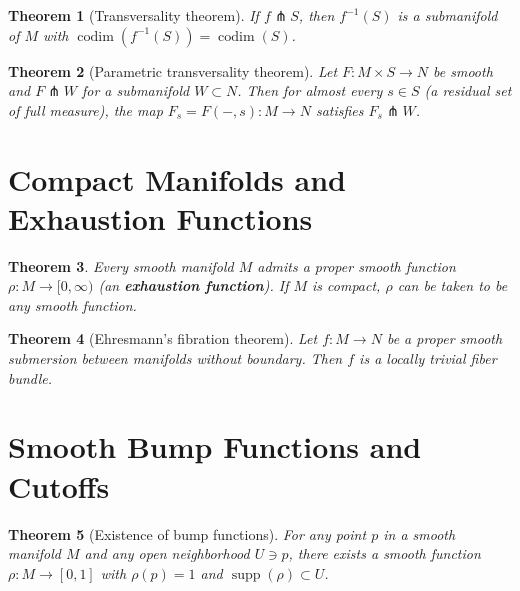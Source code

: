 \documentclass[12pt,a4paper,openany]{book}
\newtheorem{theorem}{Theorem}[section]
\theoremstyle{definition}
\theoremstyle{remark}
\begin{document}
\begin{theorem}[Transversality theorem]\label{thm:app-transversality}
If $f\pitchfork S$, then $f^{-1}(S)$ is a submanifold of $M$
with $\operatorname{codim}(f^{-1}(S)) = \operatorname{codim}(S)$.
\end{theorem}

\begin{theorem}[Parametric transversality theorem]\label{thm:parametric-transversality}
Let $F\colon M\times S \to N$ be smooth and $F\pitchfork W$ for a
submanifold $W\subset N$. Then for almost every $s \in S$
(a residual set of full measure), the map $F_s = F(-,s)\colon M\to N$
satisfies $F_s \pitchfork W$.
\end{theorem}

\section{Compact Manifolds and Exhaustion Functions}\label{sec:app-exhaustion}

\begin{theorem}\label{thm:app-exhaustion}
Every smooth manifold $M$ admits a proper smooth function
$\rho\colon M \to [0,\infty)$ (an \textbf{exhaustion function}).
If $M$ is compact, $\rho$ can be taken to be any smooth function.
\end{theorem}

\begin{theorem}[Ehresmann's fibration theorem]\label{thm:app-ehresmann}
Let $f\colon M\to N$ be a proper smooth submersion between manifolds
without boundary. Then $f$ is a locally trivial fiber bundle.
\end{theorem}

\section{Smooth Bump Functions and Cutoffs}\label{sec:app-bump}

\begin{theorem}[Existence of bump functions]\label{thm:app-bump}
For any point $p$ in a smooth manifold $M$ and any open neighborhood
$U \ni p$, there exists a smooth function $\rho\colon M \to [0,1]$
with $\rho(p)=1$ and $\operatorname{supp}(\rho)\subset U$.
\end{theorem}
\end{document}
